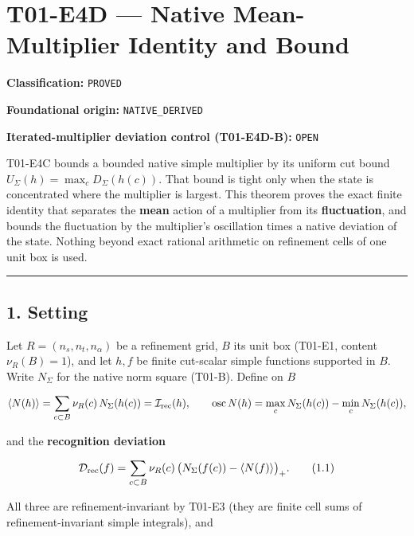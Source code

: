 \hypertarget{t01-e4d-native-mean-multiplier-identity-and-bound}{%
\chapter{T01-E4D --- Native Mean-Multiplier Identity and Bound}\label{t01-e4d-native-mean-multiplier-identity-and-bound}}

\textbf{Classification:} \texttt{PROVED}

\textbf{Foundational origin:} \texttt{NATIVE\_DERIVED}

\textbf{Iterated-multiplier deviation control (T01-E4D-B):} \texttt{OPEN}

T01-E4C bounds a bounded native simple multiplier by its uniform cut bound
\(U_\Sigma(h)=\max_c D_\Sigma(h(c))\). That bound is tight only when the state
is concentrated where the multiplier is largest. This theorem proves the exact
finite identity that separates the \textbf{mean} action of a multiplier from its
\textbf{fluctuation}, and bounds the fluctuation by the multiplier's oscillation
times a native deviation of the state. Nothing beyond exact rational
arithmetic on refinement cells of one unit box is used.

\begin{center}\rule{0.5\linewidth}{0.5pt}\end{center}

\hypertarget{setting}{%
\section{1. Setting}\label{setting}}

Let \(R=(n_s,n_t,n_\alpha)\) be a refinement grid, \(B\) its unit box
(T01-E1, content \(\nu_R(B)=1\)), and let \(h,f\) be finite cut-scalar simple
functions supported in \(B\). Write \(N_\Sigma\) for the native norm square
(T01-B). Define on \(B\)

\[
\langle N(h)\rangle=\sum_{c\subset B}\nu_R(c)\,N_\Sigma(h(c))
=\mathcal I_{\rm rec}(h),
\qquad
\operatorname{osc}N(h)=\max_c N_\Sigma(h(c))-\min_c N_\Sigma(h(c)),
\]

and the \textbf{recognition deviation}

\[
\mathcal D_{\rm rec}(f)=\sum_{c\subset B}\nu_R(c)\,
\bigl(N_\Sigma(f(c))-\langle N(f)\rangle\bigr)_+ .
\tag{1.1}
\]

All three are refinement-invariant by T01-E3 (they are finite cell sums of
refinement-invariant simple integrals), and

